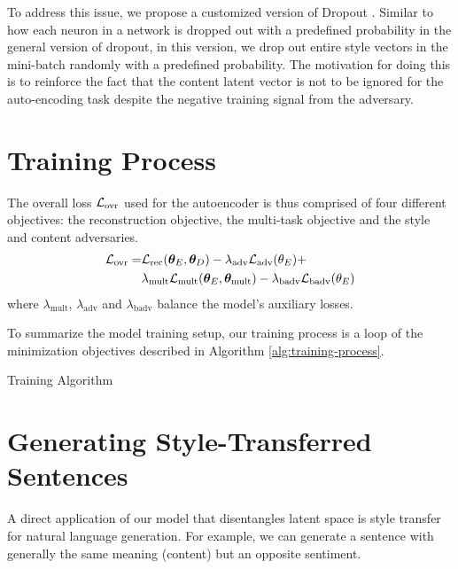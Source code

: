To address this issue, we propose a customized version of Dropout \citep{srivastava2014dropout}. Similar to how each neuron in a network is dropped out with a predefined probability in the general version of dropout, in this version, we drop out entire style vectors in the mini-batch randomly with a predefined probability. The motivation for doing this is to reinforce the fact that the content latent vector is not to be ignored for the auto-encoding task despite the negative training signal from the adversary.


\section{Training Process} \label{sec:training-process}

The overall loss $\mathcal{L}_\text{ovr}$ used for the autoencoder is thus comprised of four different objectives: the reconstruction objective, the multi-task objective and the style and content adversaries.
\begin{align*}
	\mathcal{L}_\text{ovr} =
	 & \mathcal{L}_\text{rec}(\bm\theta_E, \bm\theta_D) - \lambda_\text{adv} \mathcal{L}_\text{adv}(\theta_E) +                                \\
	 & \lambda_\text{mult} \mathcal{L}_\text{mult} (\bm\theta_E,\bm\theta_\text{mult}) - \lambda_\text{badv} \mathcal{L}_\text{badv}(\theta_E)
\end{align*}
where $\lambda_\text{mult}$, $\lambda_\text{adv}$ and $\lambda_\text{badv}$ balance the model's auxiliary losses.

To summarize the model training setup, our training process is a loop of the minimization objectives described in Algorithm \ref{alg:training-process}.

\begin{algorithm}[H]
	\caption{\label{alg:training-process} Training Algorithm}
\end{algorithm}


\section{Generating Style-Transferred Sentences} \label{sec:generating-novel-text}

A direct application of our model that disentangles latent space is style transfer for natural language generation. For example, we can generate a sentence with generally the same meaning (content) but an opposite sentiment.

